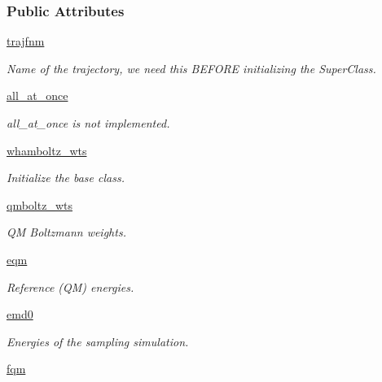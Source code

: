 \subsubsection*{Public Attributes}
\begin{DoxyCompactItemize}
\item 
\hyperlink{classforcebalance_1_1amberio_1_1AbInitio__AMBER_a5521a1a249650355e3e1f20eb3a0c25b}{trajfnm}
\begin{DoxyCompactList}\small\item\em Name of the trajectory, we need this B\-E\-F\-O\-R\-E initializing the Super\-Class. \end{DoxyCompactList}\item 
\hyperlink{classforcebalance_1_1amberio_1_1AbInitio__AMBER_a39462b1942be0f7fb6202862ad1afa9c}{all\-\_\-at\-\_\-once}
\begin{DoxyCompactList}\small\item\em all\-\_\-at\-\_\-once is not implemented. \end{DoxyCompactList}\item 
\hyperlink{classforcebalance_1_1abinitio_1_1AbInitio_a885e7ef58b9e7c6abbc24321e5f3c61a}{whamboltz\-\_\-wts}
\begin{DoxyCompactList}\small\item\em Initialize the base class. \end{DoxyCompactList}\item 
\hyperlink{classforcebalance_1_1abinitio_1_1AbInitio_a06ec6b12d81791ca94f599f41e56335a}{qmboltz\-\_\-wts}
\begin{DoxyCompactList}\small\item\em Q\-M Boltzmann weights. \end{DoxyCompactList}\item 
\hyperlink{classforcebalance_1_1abinitio_1_1AbInitio_a64387fae9bdfb0d03ca6961e67c779be}{eqm}
\begin{DoxyCompactList}\small\item\em Reference (Q\-M) energies. \end{DoxyCompactList}\item 
\hyperlink{classforcebalance_1_1abinitio_1_1AbInitio_af928d333d14cb3b93f7db78530455873}{emd0}
\begin{DoxyCompactList}\small\item\em Energies of the sampling simulation. \end{DoxyCompactList}\item 
\hyperlink{classforcebalance_1_1abinitio_1_1AbInitio_af025be2ce97da3e8dc876d70e403f4ef}{fqm}

\end{DoxyCompactItemize}
